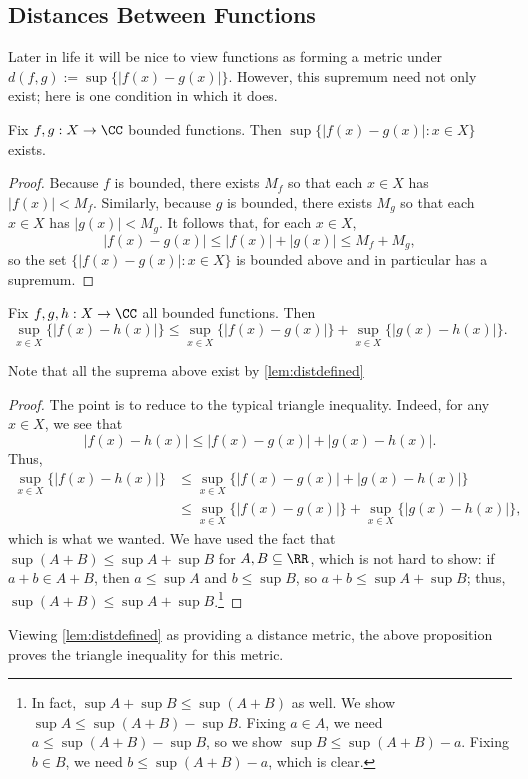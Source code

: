 \subsection{Distances Between Functions}
Later in life it will be nice to view functions as forming a metric under $d(f,g):=\sup\{|f(x)-g(x)|\}$. However, this supremum need not only exist; here is one condition in which it does.
\begin{lemma} \label{lem:distdefined}
	Fix $f,g:X\to\CC$ bounded functions. Then $\sup\{|f(x)-g(x)|:x\in X\}$ exists.
\end{lemma}
\begin{proof}
	Because $f$ is bounded, there exists $M_f$ so that each $x\in X$ has $|f(x)|<M_f$. Similarly, because $g$ is bounded, there exists $M_g$ so that each $x\in X$ has $|g(x)|<M_g$. It follows that, for each $x\in X$,
	\[|f(x)-g(x)|\le|f(x)|+|g(x)|\le M_f+M_g,\]
	so the set $\{|f(x)-g(x)|:x\in X\}$ is bounded above and in particular has a supremum.
\end{proof}
\begin{proposition}
	Fix $f,g,h:X\to\CC$ all bounded functions. Then
	\[\sup_{x\in X}\{|f(x)-h(x)|\}\le\sup_{x\in X}\{|f(x)-g(x)|\}+\sup_{x\in X}\{|g(x)-h(x)|\}.\]
\end{proposition}
Note that all the suprema above exist by \autoref{lem:distdefined}
\begin{proof}
	The point is to reduce to the typical triangle inequality. Indeed, for any $x\in X$, we see that
	\[|f(x)-h(x)|\le|f(x)-g(x)|+|g(x)-h(x)|.\]
	Thus,
	\begin{align*}
		\sup_{x\in X}\{|f(x)-h(x)|\} &\le \sup_{x\in X}\{|f(x)-g(x)|+|g(x)-h(x)|\} \\
		&\le \sup_{x\in X}\{|f(x)-g(x)|\}+\sup_{x\in X}\{|g(x)-h(x)|\},
	\end{align*}
	which is what we wanted. We have used the fact that $\sup(A+B)\le\sup A+\sup B$ for $A,B\subseteq\RR$, which is not hard to show: if $a+b\in A+B$, then $a\le\sup A$ and $b\le\sup B$, so $a+b\le\sup A+\sup B$; thus, $\sup(A+B)\le\sup A+\sup B$.\footnote{In fact, $\sup A+\sup B\le\sup(A+B)$ as well. We show $\sup A\le\sup(A+B)-\sup B$. Fixing $a\in A$, we need $a\le\sup(A+B)-\sup B$, so we show $\sup B\le\sup(A+B)-a$. Fixing $b\in B$, we need $b\le\sup(A+B)-a$, which is clear.}
\end{proof}
\begin{remark}[Nir]
	Viewing \autoref{lem:distdefined} as providing a distance metric, the above proposition proves the triangle inequality for this metric.
\end{remark}
